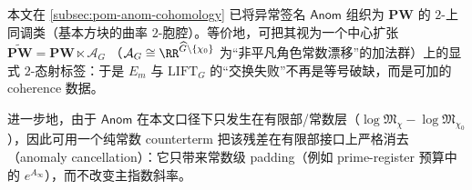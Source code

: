 \begin{remark}\label{rem:pom-bridge-kit-strictification}
本文在 \ref{subsec:pom-anom-cohomology} 已将异常签名 \(\mathsf{Anom}\) 组织为 \(\mathbf{PW}\) 的 \(2\)-上同调类（基本方块的曲率 \(2\)-胞腔）。等价地，可把其视为一个中心扩张
\(
\widetilde{\mathbf{PW}}=\mathbf{PW}\ltimes \mathcal{A}_G
\)
（\(\mathcal{A}_G\cong\RR^{\widehat G\setminus\{\chi_0\}}\) 为“非平凡角色常数漂移”的加法群）上的显式 \(2\)-态射标签：于是 \(E_m\) 与 \(\mathrm{LIFT}_G\) 的“交换失败”不再是等号破缺，而是可加的 coherence 数据。
\par
进一步地，由于 \(\mathsf{Anom}\) 在本文口径下只发生在有限部/常数层（\(\log\mathfrak{M}_\chi-\log\mathfrak{M}_{\chi_0}\)），因此可用一个纯常数 counterterm 把该残差在有限部接口上严格消去（anomaly cancellation）：它只带来常数级 padding（例如 prime-register 预算中的 \(e^{A_\infty}\)），而不改变主指数斜率。
\end{remark}

